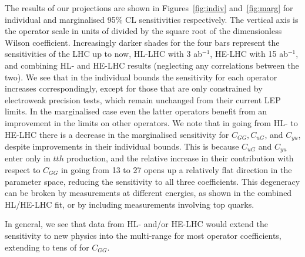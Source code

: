 \documentclass[../report.tex]{subfiles}
\providecommand{\main}{..}
\begin{document}
The results of our projections are shown in Figures~\ref{fig:indiv} and~\ref{fig:marg} for individual and marginalised 95\% CL sensitivities respectively. The vertical axis is the operator scale in units of \UTeV divided by the square root of the dimensionless Wilson coefficient. Increasingly darker shades for the four bars represent the sensitivities of the LHC up to now, HL-LHC with 3 ab$^{-1}$, HE-LHC with 15 ab$^{-1}$, and combining HL- and HE-LHC results (neglecting any correlations between the two). We see that in the individual bounds the sensitivity for each operator increases correspondingly, except for those that are only constrained by electroweak precision tests, which remain unchanged from their current LEP limits. In the marginalised case even the latter operators benefit from an improvement in the limits on other operators. We note that in going from HL- to HE-LHC there is a decrease in the marginalised sensitivity for $C_{GG}, C_{uG}$, and $C_{yu}$, despite improvements in their individual bounds. This is because $C_{uG}$ and $C_{yu}$ enter only in $tth$ production, and the relative increase in their contribution with respect to $C_{GG}$ in going from 13 to 27 \UTeV opens up a relatively flat direction in the parameter space, reducing the sensitivity to all three coefficients. This degeneracy can be broken by measurements at different energies, as shown in the combined HL/HE-LHC fit, or by including measurements involving top quarks.

In general, we see that data from HL- and/or HE-LHC would extend the sensitivity to new physics into the multi-\UTeV range
for most operator coefficients, extending to tens of \UTeV for $C_{GG}$.













\FloatBarrier

\end{document}
